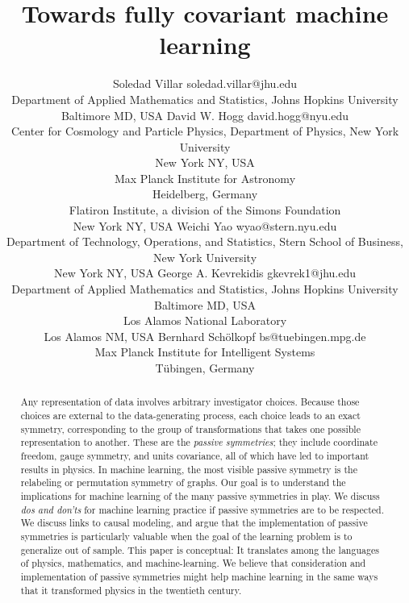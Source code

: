 \documentclass{article} %
\title{Towards fully covariant machine learning}
\author{\name Soledad Villar\footnotemark[1]{} \email soledad.villar@jhu.edu\\
      \addr Department of Applied Mathematics and Statistics, Johns Hopkins University\\
            Baltimore MD, USA
      \AND
      \name David W. Hogg\footnotemark[1]{} \email david.hogg@nyu.edu\\
      \addr Center for Cosmology and Particle Physics, Department of Physics, New York University\\
            New York NY, USA\\[1ex]
            Max Planck Institute for Astronomy\\
            Heidelberg, Germany\\[1ex]
            Flatiron Institute, a division of the Simons Foundation\\
            New York NY, USA
      \AND
      \name Weichi Yao \email wyao@stern.nyu.edu\\
      \addr Department of Technology, Operations, and Statistics, Stern School of Business, New York University\\
            New York NY, USA
      \AND
      \name George A. Kevrekidis \email gkevrek1@jhu.edu\\
      \addr Department of Applied Mathematics and Statistics, Johns Hopkins University\\
            Baltimore MD, USA\\[1ex]
            Los Alamos National Laboratory\\
            Los Alamos NM, USA
      \AND
      \name Bernhard Sch\"olkopf \email bs@tuebingen.mpg.de\\
      \addr Max Planck Institute for Intelligent Systems\\ 
            T\"ubingen, Germany
     }
\begin{document}
\maketitle\thispagestyle{plain}%

\begin{abstract}
Any representation of data involves arbitrary investigator choices.
Because those choices are external to the data-generating process, each choice leads to an exact symmetry, corresponding to the group of transformations that takes one possible representation to another.
These are the \emph{passive symmetries}; they include coordinate freedom, gauge symmetry, and units covariance, all of which have led to important results in physics.
In machine learning, the most visible passive symmetry is the relabeling or permutation symmetry of graphs.
Our goal is to understand the implications for machine learning of the many passive symmetries in play.
We discuss \emph{dos and don'ts} for machine learning practice if passive symmetries are to be respected.
We discuss links to causal modeling, and argue that the implementation of passive symmetries is particularly valuable when the goal of the learning problem is to generalize out of sample.
This paper is conceptual:
It translates among the languages of physics, mathematics, and machine-learning.
We believe that consideration and implementation of passive symmetries might help machine learning in the same ways that it transformed physics in the twentieth century.
\end{abstract}
\end{document}
